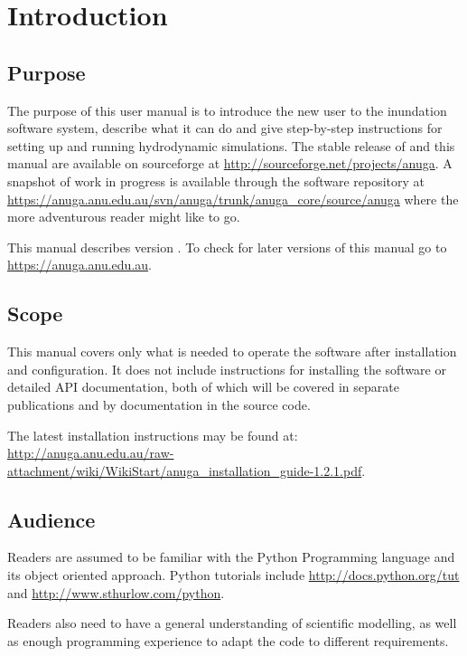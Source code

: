 \documentclass{manual}
\begin{document}

\chapter{Introduction}


\section{Purpose}

The purpose of this user manual is to introduce the new user to the
inundation software system, describe what it can do and give step-by-step
instructions for setting up and running hydrodynamic simulations.
The stable release of \anuga and this manual are available on sourceforge at
\url{http://sourceforge.net/projects/anuga}. A snapshot of work in progress is
available through the \anuga software repository at
\url{https://anuga.anu.edu.au/svn/anuga/trunk/anuga_core/source/anuga}
where the more adventurous reader might like to go.

This manual describes \anuga version \version. To check for later versions of this manual
go to \url{https://anuga.anu.edu.au}.

\section{Scope}

This manual covers only what is needed to operate the software after
installation and configuration. It does not include instructions
for installing the software or detailed API documentation, both of
which will be covered in separate publications and by documentation
in the source code.

The latest installation instructions may be found at:
\url{http://anuga.anu.edu.au/raw-attachment/wiki/WikiStart/anuga_installation_guide-1.2.1.pdf}.

\section{Audience}

Readers are assumed to be familiar with the Python Programming language and
its object oriented approach.
Python tutorials include
\url{http://docs.python.org/tut} and \url{http://www.sthurlow.com/python}.

Readers also need to have a general understanding of scientific modelling,
as well as enough programming experience to adapt the code to different
requirements.
\end{document}
